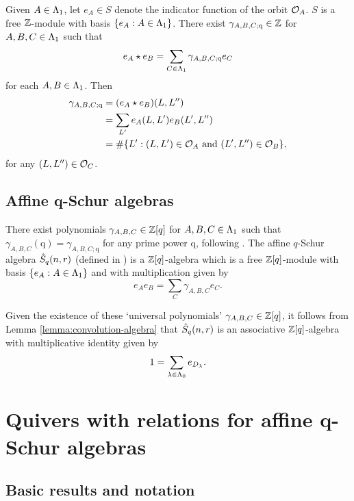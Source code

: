 \documentclass[a4paper, 11pt]{report}
\begin{document}
Given $A\in{\Lambda_1}$, let $e_A\in S$ denote the indicator function of the orbit $\mathcal{O}_{A}$. $S$ is a free $\mathbb{Z}$-module with basis $\{e_A:A\in{\Lambda_1}\}$. There exist $\gamma_{A,B,C;\mathrm{q}}\in\mathbb{Z}$ for $A,B,C\in{\Lambda_1}$ such that
\begin{equation*}
e_A\star e_B = \sum_{C\in{\Lambda_1}} \gamma_{A,B,C;\mathrm{q}}e_C
\end{equation*}
for each $A,B\in{\Lambda_1}$. Then
\begin{align*}
\gamma_{A,B,C;\mathrm{q}}
&=(e_A\star e_B)(L,L'')\\
&= \sum_{L'} e_A(L,L')e_B(L',L'')\\
&= \#\{L':(L,L')\in\mathcal{O}_{A} \text{ and }(L',L'')\in\mathcal{O}_{B}\},
\end{align*}
for any $(L,L'')\in\mathcal{O}_{C}$.

\section{Affine q-Schur algebras}

There exist polynomials $\gamma_{A,B,C}\in\mathbb{Z}[q]$ for $A,B,C\in{\Lambda_1}$ such that $\gamma_{A,B,C}(\mathrm{q}) = \gamma_{A,B,C;\mathrm{q}}$ for any prime power $\mathrm{q}$, following \cite[section 4]{lusztig99}. The affine $q$-Schur algebra $\hat{S}_q(n,r)$ (defined in \needsreference) is a $\mathbb{Z}[q]$-algebra which is a free $\mathbb{Z}[q]$-module with basis $\{e_A:A\in{\Lambda_1}\}$ and with multiplication given by
\begin{equation*}
e_A e_B = \sum_{C} \gamma_{A,B,C}e_C.
\end{equation*}

Given the existence of these `universal polynomials' $\gamma_{A,B,C}\in\mathbb{Z}[q]$, it follows from Lemma \ref{lemma:convolution-algebra} that $\hat{S}_q(n,r)$ is an associative $\mathbb{Z}[q]$-algebra with multiplicative identity given by
\begin{equation*}
1 = \sum_{\lambda\in{\Lambda_0}} e_{D_\lambda}.
\end{equation*}

\chapter{Quivers with relations for affine q-Schur algebras}

\section{Basic results and notation}
\end{document}
